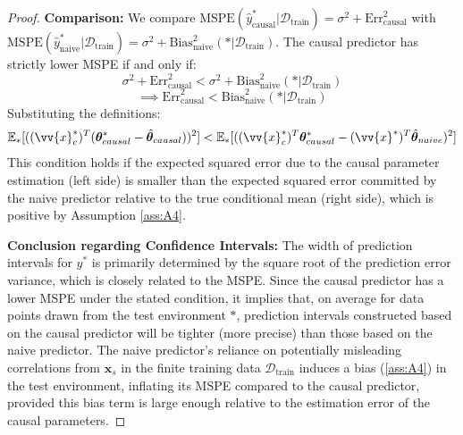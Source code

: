 \documentclass{article}
\newcommand{\covarsympvec}{\bm{x}_s}            %
\newcommand{\covarvecaugtest}{\vv{x}^*}             %
\newcommand{\covarcausevecaugtest}{\vv{x}_c^*}         %
\newcommand{\param}{\theta}                     %
\newcommand{\paramvec}{\bm{\param}}             %
\newcommand{\paramtruecausal}{\paramvec_{causal}^*} %
\newcommand{\paramhatcausal}{\hat{\paramvec}_{causal}} %
\newcommand{\paramhatnaive}{\hat{\paramvec}_{naive}} %
\newcommand{\envtest}{*}                        %
\newcommand{\dataset}{\mathcal{D}}              %
\newcommand{\datasettrain}{\dataset_{\text{train}}} %
\newcommand{\prednaive}{\hat{y}_{\text{naive}}^*} %
\newcommand{\predcausal}{\hat{y}_{\text{causal}}^*} %
\newcommand{\Expect}{\mathbb{E}}                %
\newcommand{\MSPE}{\mathrm{MSPE}}               %
\begin{document}
\begin{proof}
\textbf{Comparison:}
We compare $\MSPE(\predcausal | \datasettrain) = \sigma^2 + \text{Err}^2_{\text{causal}}$ with $\MSPE(\prednaive | \datasettrain) = \sigma^2 + \text{Bias}^2_{\text{naive}}(\envtest | \datasettrain)$.
The causal predictor has strictly lower MSPE if and only if:
\[ \sigma^2 + \text{Err}^2_{\text{causal}} < \sigma^2 + \text{Bias}^2_{\text{naive}}(\envtest | \datasettrain) \]
\[ \implies \text{Err}^2_{\text{causal}} < \text{Bias}^2_{\text{naive}}(\envtest | \datasettrain) \]
Substituting the definitions:
\[ \Expect_{\envtest}[ ((\covarcausevecaugtest)^T (\paramtruecausal - \paramhatcausal))^2 ] < \Expect_{\envtest}[ ((\covarcausevecaugtest)^T \paramtruecausal - (\covarvecaugtest)^T \paramhatnaive)^2 ] \]
This condition holds if the expected squared error due to the causal parameter estimation (left side) is smaller than the expected squared error committed by the naive predictor relative to the true conditional mean (right side), which is positive by Assumption \ref{ass:A4}.

\textbf{Conclusion regarding Confidence Intervals:}
The width of prediction intervals for $y^*$ is primarily determined by the square root of the prediction error variance, which is closely related to the MSPE. Since the causal predictor has a lower MSPE under the stated condition, it implies that, on average for data points drawn from the test environment $\envtest$, prediction intervals constructed based on the causal predictor will be tighter (more precise) than those based on the naive predictor. The naive predictor's reliance on potentially misleading correlations from $\covarsympvec$ in the finite training data $\datasettrain$ induces a bias (\ref{ass:A4}) in the test environment, inflating its MSPE compared to the causal predictor, provided this bias term is large enough relative to the estimation error of the causal parameters.
\end{proof}
\end{document}
